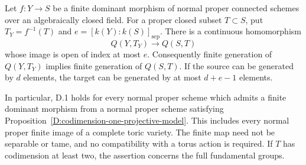 \begin{proposition}
\label{D:finite-normal-tame-descent}
Let $f:Y\to S$ be a finite dominant morphism of normal proper
connected schemes over an algebraically closed field. For a proper
closed subset $T\subset S$, put $T_Y=f^{-1}(T)$ and
$e=[k(Y):k(S)]_{\mathrm{sep}}$. There is a continuous homomorphism
\[
                     Q(Y,T_Y)\longrightarrow Q(S,T)
\]
whose image is open of index at most $e$. Consequently finite
generation of $Q(Y,T_Y)$ implies finite generation of $Q(S,T)$.
If the source can be generated by $d$ elements, the target can be
generated by at most $d+e-1$ elements.

In particular, D.1 holds for every normal proper scheme which
admits a finite dominant morphism from a normal proper scheme
satisfying Proposition~\ref{D:codimension-one-projective-model}.
This includes every normal proper finite image of a complete toric
variety. The finite map need not be separable or tame, and no
compatibility with a torus action is required. If $T$ has
codimension at least two, the assertion concerns the full
fundamental groups.
\end{proposition}

